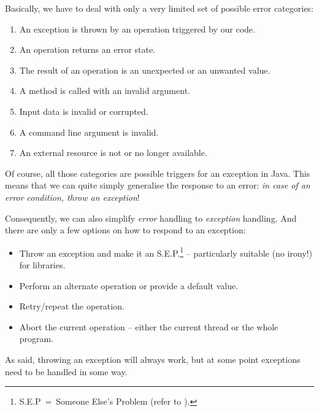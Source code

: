 \documentclass[11pt,a4paper, titlepage, parskip=half, headsepline, footsepline, cleardoublepage=current, headheight=1cm]{scrbook}
\begin{document}
Basically, we have to deal with only a very limited set of possible error categories:
\begin{enumerate}[nosep]
\item{An exception is thrown by an operation triggered by our code.}
\item{An operation returns an error state.}
\item{The result of an operation is an unexpected or an unwanted value.}
\item{A method is called with an invalid argument.}
\item{Input data is invalid or corrupted.}
\item{A command line argument is invalid.}
\item{An external resource is not or no longer available.}
\end{enumerate}

Of course, all those categories are possible triggers for an exception in Java. This means that we can quite simply generalise the response to an error: \textit{in case of an error condition, throw an exception}!

Consequently, we can also simplify \textit{error} handling to \textit{exception} handling. And there are only a few options on how to respond to an exception:
\begin{itemize}
\item{Throw an exception and make it an S.E.P.\footnote{S.E.P~=~Someone Else's Problem (refer to \autocite{ADAMS_HITCHHIKERS_GUIDE}).} – particularly suitable (no irony!) for libraries.}
\item{Perform an alternate operation or provide a default value.}
\item{Retry/repeat the operation.}
\item{Abort the current operation – either the current thread or the whole program.}
\end{itemize}

As said, throwing an exception will always work, but at some point exceptions need to be handled in some way.
\end{document}
